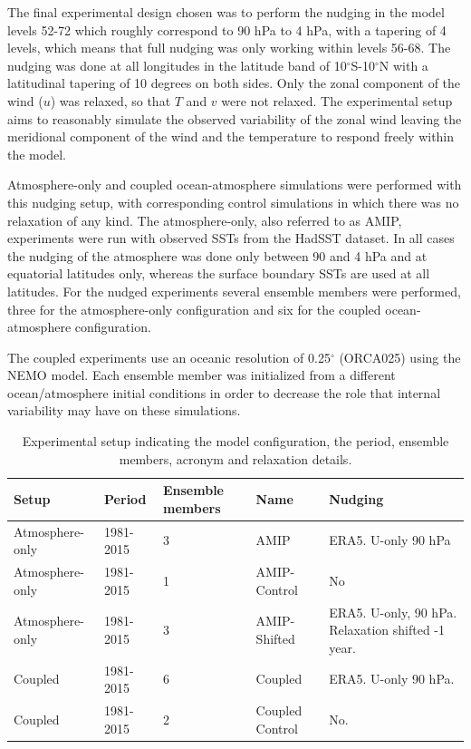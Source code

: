 
The final experimental design chosen was to perform the nudging in the model levels 52-72 which roughly correspond to 90 hPa to 4 hPa, with a tapering of 4 levels, which means that full nudging was only working within levels 56-68. The nudging was done at all longitudes in the latitude band of 10$^\circ$S-10$^\circ$N with a latitudinal tapering of 10 degrees on both sides. Only the zonal component of the wind ($u$) was relaxed, so that $T$ and $v$ were not relaxed. 
The experimental setup aims to reasonably simulate the observed variability of the zonal wind leaving the meridional component of the wind and the temperature to respond freely within the model. 

Atmosphere-only and coupled ocean-atmosphere simulations were performed with this nudging setup, with corresponding control simulations in which there was no relaxation of any kind. The atmosphere-only, also referred to as AMIP, experiments were run with observed SSTs from the HadSST dataset. In all cases the nudging of the atmosphere was done only between 90 and 4 hPa and at equatorial latitudes only, whereas the surface boundary SSTs are used at all latitudes.
For the nudged experiments several ensemble members were performed, three for the atmosphere-only configuration and six for the coupled ocean-atmosphere configuration. 

The coupled experiments use an oceanic resolution of 0.25$^\circ$ (ORCA025) using the NEMO model. Each ensemble member was initialized from a different ocean/atmosphere initial conditions in order to decrease the role that internal variability may have on these simulations. 

\begin{table}[t!]
\caption{Experimental setup indicating the model configuration, the period, ensemble members, acronym and relaxation details.}
\begin{tabular}{p{2.3cm}|p{2.3cm}|p{1.73cm}|p{3cm}|p{5cm}}
Setup           & Period    & Ensemble members & Name            & Nudging                                          \\ \hline \hline
Atmosphere-only & 1981-2015 & 3                & AMIP            & ERA5. U-only 90 hPa                              \\
Atmosphere-only & 1981-2015 & 1                & AMIP-Control    & No                                               \\
Atmosphere-only & 1981-2015 & 3                & AMIP-Shifted    & ERA5. U-only, 90 hPa. Relaxation shifted -1 year. \\
Coupled         & 1981-2015 & 6                & Coupled         & ERA5. U-only 90 hPa.                             \\
Coupled         & 1981-2015 & 2                & Coupled Control & No.                                             
\end{tabular}
\end{table}

